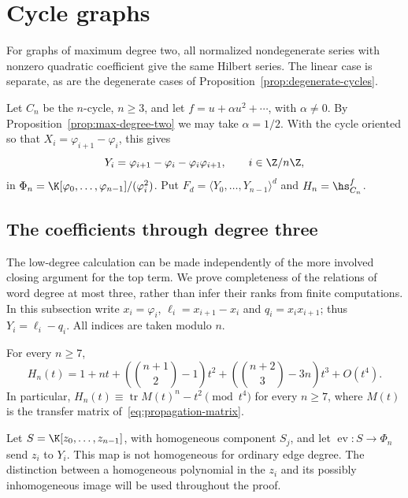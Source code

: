 \section{Cycle graphs}
\label{sec:cycles}

For graphs of maximum degree two, all normalized nondegenerate series
with nonzero quadratic coefficient give the same Hilbert series. The
linear case is separate, as are the degenerate cases of
Proposition~\ref{prop:degenerate-cycles}.

Let $C_n$ be the $n$-cycle, $n\ge3$, and let
$f=u+\alpha u^2+\cdots$, with $\alpha\ne0$.
By Proposition~\ref{prop:max-degree-two} we may take $\alpha=1/2$. With the cycle oriented
so that $X_i=\varphi_{i+1}-\varphi_i$, this gives
\begin{equation}\label{eq:cycle-normalization}
Y_i=\varphi_{i+1}-\varphi_i-\varphi_i\varphi_{i+1},
\qquad i\in\Z/n\Z,
\end{equation}
in $\Phi_n=\K[\varphi_0,\ldots,\varphi_{n-1}]/(\varphi_i^2)$.
Put $F_d=\langle Y_0,\ldots,Y_{n-1}\rangle^d$ and
$H_n=\hs_{C_n}^f$.

\subsection{The coefficients through degree three}
\label{sec:cycle-low-coefficients}

The low-degree calculation can be made independently of the more
involved closing argument for the top term. We prove completeness of the
relations of word degree at most three, rather than infer their ranks
from finite computations. In this subsection write $x_i=\varphi_i$,
$\ell_i=x_{i+1}-x_i$ and $q_i=x_ix_{i+1}$; thus
$Y_i=\ell_i-q_i$. All indices are taken modulo $n$.

\begin{theorem}\label{thm:cycle-low-coefficients}
For every $n\ge7$,
\begin{equation}\label{eq:cycle-low-coefficients}
 H_n(t)=1+nt+\left(\binom{n+1}{2}-1\right)t^2
              +\left(\binom{n+2}{3}-3n\right)t^3+O(t^4).
\end{equation}
In particular,
$H_n(t)\equiv\operatorname{tr}M(t)^n-t^2\pmod{t^4}$ for every $n\ge7$,
where $M(t)$ is the transfer matrix of~\eqref{eq:propagation-matrix}.
\end{theorem}

Let $S=\K[z_0,\ldots,z_{n-1}]$, with homogeneous component $S_j$, and
let $\operatorname{ev}:S\to\Phi_n$ send $z_i$ to $Y_i$. This map is
not homogeneous for ordinary edge degree. The distinction between a
homogeneous polynomial in the $z_i$ and its possibly inhomogeneous image
will be used throughout the proof.

